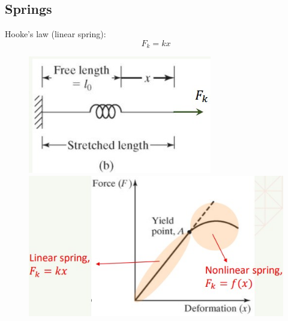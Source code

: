 \documentclass[class=report, crop=false, 12pt,a4paper]{standalone}
\begin{document}
\subsection{Springs}
Hooke's law (linear spring):
\begin{equation}
    F_k = kx
\end{equation}
\begin{figure}[H]
    \centering
    \begin{minipage}{.5\textwidth}
      \centering
      \includegraphics[width=.8\linewidth]{../img/diagram14.jpg}
    \end{minipage}%
    \begin{minipage}{.5\textwidth}
      \centering
      \includegraphics[width=.8\linewidth]{../img/diagram15.jpg}
    \end{minipage}
\end{figure}
\end{document}

